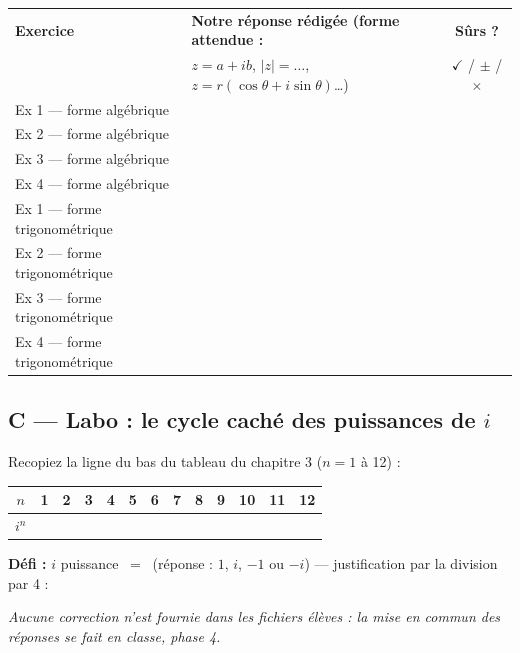 \documentclass[11pt,a4paper]{article}
\renewcommand{\arraystretch}{1.4}
\newcommand{\pointilles}{\makebox[3.5cm]{\dotfill}}
\begin{document}
\begin{center}
\renewcommand{\arraystretch}{2.2}
\begin{tabularx}{\textwidth}{|X|X|c|}
  \hline
  \textbf{Exercice} & \textbf{Notre réponse rédigée (forme attendue :}
  & \textbf{Sûrs ?} \\
   & $z = a + ib$, $|z| = \dots$, $z = r(\cos\theta + i\sin\theta)$\dots)
  & $\checkmark$ / $\pm$ / $\times$ \\ \hline
  Ex 1 --- forme algébrique & & \\ \hline
  Ex 2 --- forme algébrique & & \\ \hline
  Ex 3 --- forme algébrique & & \\ \hline
  Ex 4 --- forme algébrique & & \\ \hline
  Ex 1 --- forme trigonométrique & & \\ \hline
  Ex 2 --- forme trigonométrique & & \\ \hline
  Ex 3 --- forme trigonométrique & & \\ \hline
  Ex 4 --- forme trigonométrique & & \\ \hline
\end{tabularx}
\end{center}

\subsection*{C --- Labo : le cycle caché des puissances de $i$}

Recopiez la ligne du bas du tableau du chapitre 3 ($n = 1$ à 12) :

\begin{center}
\renewcommand{\arraystretch}{2}
\begin{tabular}{|c|*{12}{c|}}
  \hline
  $n$ & 1 & 2 & 3 & 4 & 5 & 6 & 7 & 8 & 9 & 10 & 11 & 12 \\ \hline
  $i^{n}$ & & & & & & & & & & & & \\ \hline
\end{tabular}
\end{center}

\textbf{Défi :} $i$ puissance \pointilles\ = \pointilles\
(réponse : $1$, $i$, $-1$ ou $-i$) --- justification par la division
par 4 :

\pointilles\par\pointilles

\vspace{4pt}
\emph{Aucune correction n'est fournie dans les fichiers élèves : la mise en
commun des réponses se fait en classe, phase 4.}
\end{document}
